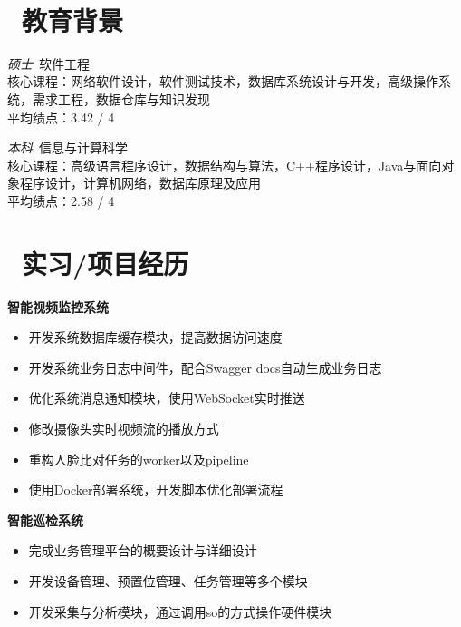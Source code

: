 \documentclass{resume}
\begin{document}


  \centerline { \textperiodcentered\ 
  }

\section{\faGraduationCap\ 教育背景}
\textit{硕士}\ 软件工程
\\核心课程：网络软件设计，软件测试技术，数据库系统设计与开发，高级操作系统，需求工程，数据仓库与知识发现
\\平均绩点：3.42 / 4

\textit{本科}\ 信息与计算科学
\\核心课程：高级语言程序设计，数据结构与算法，C++程序设计，Java与面向对象程序设计，计算机网络，数据库原理及应用
\\平均绩点：2.58 / 4

\section{\faBriefcase\ 实习/项目经历}
\textbf{智能视频监控系统}
\begin{itemize}
  \item 开发系统数据库缓存模块，提高数据访问速度
  \item 开发系统业务日志中间件，配合Swagger docs自动生成业务日志
  \item 优化系统消息通知模块，使用WebSocket实时推送
  \item 修改摄像头实时视频流的播放方式
  \item 重构人脸比对任务的worker以及pipeline
  \item 使用Docker部署系统，开发脚本优化部署流程
\end{itemize}

\textbf{智能巡检系统}
\begin{itemize}
  \item 完成业务管理平台的概要设计与详细设计
  \item 开发设备管理、预置位管理、任务管理等多个模块
  \item 开发采集与分析模块，通过调用so的方式操作硬件模块
\end{itemize}
\end{document}
